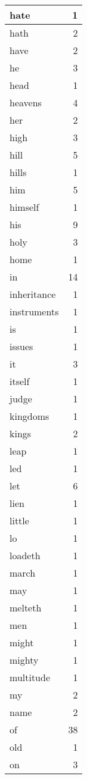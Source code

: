 \begin{center}
\begin{longtable}{l|r}
hate & 1 \\ \hline
hath & 2 \\ \hline
have & 2 \\ \hline
he & 3 \\ \hline
head & 1 \\ \hline
heavens & 4 \\ \hline
her & 2 \\ \hline
high & 3 \\ \hline
hill & 5 \\ \hline
hills & 1 \\ \hline
him & 5 \\ \hline
himself & 1 \\ \hline
his & 9 \\ \hline
holy & 3 \\ \hline
home & 1 \\ \hline
in & 14 \\ \hline
inheritance & 1 \\ \hline
instruments & 1 \\ \hline
is & 1 \\ \hline
issues & 1 \\ \hline
it & 3 \\ \hline
itself & 1 \\ \hline
judge & 1 \\ \hline
kingdoms & 1 \\ \hline
kings & 2 \\ \hline
leap & 1 \\ \hline
led & 1 \\ \hline
let & 6 \\ \hline
lien & 1 \\ \hline
little & 1 \\ \hline
lo & 1 \\ \hline
loadeth & 1 \\ \hline
march & 1 \\ \hline
may & 1 \\ \hline
melteth & 1 \\ \hline
men & 1 \\ \hline
might & 1 \\ \hline
mighty & 1 \\ \hline
multitude & 1 \\ \hline
my & 2 \\ \hline
name & 2 \\ \hline
of & 38 \\ \hline
old & 1 \\ \hline
on & 3 \\ \hline

\end{longtable}
\end{center}
